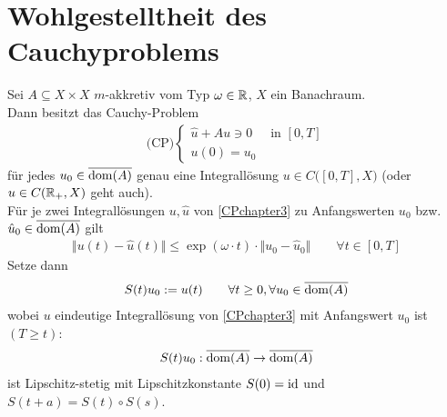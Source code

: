
\chapter{Wohlgestelltheit des Cauchyproblems} %
\setcounter{section}{1}
\begin{theorem}\label{theoremCrandall-Liggett}\enter
	Sei $A\subseteq X\times X$ $m$-akkretiv vom Typ $\omega\in\mathbb{R}$, $X$ ein Banachraum.\\
	Dann besitzt das Cauchy-Problem
	\begin{align}\label{CPchapter3}\tag{CP}
		\text{(CP)}\left\lbrace\begin{array}{rl}
			\hat{u}+Au\ni 0&\text{ in }[0,T]\\
			u(0)=u_0&
		\end{array}\right.
	\end{align}
	für jedes $u_0\in\overline{\operatorname{dom}(A)}$ genau eine Integrallösung $u\in C\big([0,T],X\big)$ (oder $u\in C(\mathbb{R}_+,X)$ geht auch).\\
	Für je zwei Integrallösungen $u,\hat{u}$ von \eqref{CPchapter3} zu Anfangswerten $u_0$ bzw. $\hat{u}_0\in\overline{\operatorname{dom}(A)}$ gilt
	\begin{align*}
		\big\Vert u(t)-\hat{u}(t)\big\Vert
		\leq\exp(\omega\cdot t)\cdot\big\Vert u_0-\hat{u}_0\big\Vert\qquad\forall t\in[0,T]
	\end{align*}
	Setze dann
	\begin{align*}
		S(t)u_0:=u(t)\qquad\forall t\geq0,\forall u_0\in\overline{\operatorname{dom}(A)}
	\end{align*}
	wobei $u$ eindeutige Integrallösung von \eqref{CPchapter3} mit Anfangswert $u_0$ ist $(T\geq t)$:
	\begin{align*}
		S(t)u_0:\overline{\operatorname{dom}(A)}\to\overline{\operatorname{dom}(A)}
	\end{align*}
	ist Lipschitz-stetig mit Lipschitzkonstante $S(0)=\operatorname{id}$ und $S(t+a)=S(t)\circ S(s)$.
\end{theorem}

